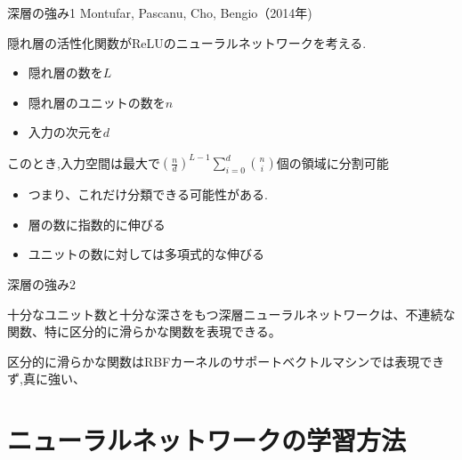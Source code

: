 \begin{frame}[fragile]{深層の強み1}
Montufar, Pascanu, Cho, Bengio（2014年)
\begin{theorem}
隠れ層の活性化関数がReLUのニューラルネットワークを考える.
\begin{itemize}
  \item 隠れ層の数を$L$
  \item 隠れ層のユニットの数を$n$
  \item 入力の次元を$d$
\end{itemize}
このとき,入力空間は最大で$\displaystyle\left(\frac{n}{d}\right)^{L-1}\sum_{i=0}^{d}\binom{n}{i}$個の領域に分割可能
\end{theorem}

\begin{itemize}
\item つまり、これだけ分類できる可能性がある.
\item 層の数に指数的に伸びる
\item ユニットの数に対しては多項式的な伸びる
\end{itemize}
\end{frame}


\begin{frame}[fragile]{深層の強み2}
\begin{theorem}
十分なユニット数と十分な深さをもつ深層ニューラルネットワークは、不連続な関数、特に区分的に滑らかな関数を表現できる。
\end{theorem}

区分的に滑らかな関数はRBFカーネルのサポートベクトルマシンでは表現できず,真に強い、
\end{frame}


\section{ニューラルネットワークの学習方法}


